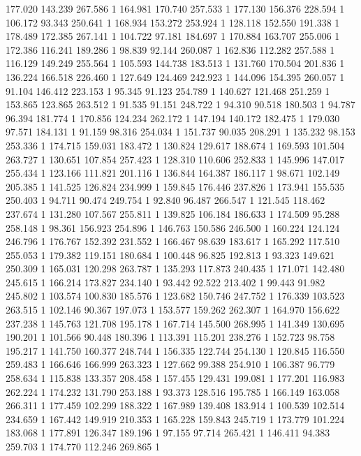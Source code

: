 	177.020	143.239	267.586	1
	164.981	170.740	257.533	1
	177.130	156.376	228.594	1
	106.172	93.343	250.641	1
	168.934	153.272	253.924	1
	128.118	152.550	191.338	1
	178.489	172.385	267.141	1
	104.722	97.181	184.697	1
	170.884	163.707	255.006	1
	172.386	116.241	189.286	1
	98.839	92.144	260.087	1
	162.836	112.282	257.588	1
	116.129	149.249	255.564	1
	105.593	144.738	183.513	1
	131.760	170.504	201.836	1
	136.224	166.518	226.460	1
	127.649	124.469	242.923	1
	144.096	154.395	260.057	1
	91.104	146.412	223.153	1
	95.345	91.123	254.789	1
	140.627	121.468	251.259	1
	153.865	123.865	263.512	1
	91.535	91.151	248.722	1
	94.310	90.518	180.503	1
	94.787	96.394	181.774	1
	170.856	124.234	262.172	1
	147.194	140.172	182.475	1
	179.030	97.571	184.131	1
	91.159	98.316	254.034	1
	151.737	90.035	208.291	1
	135.232	98.153	253.336	1
	174.715	159.031	183.472	1
	130.824	129.617	188.674	1
	169.593	101.504	263.727	1
	130.651	107.854	257.423	1
	128.310	110.606	252.833	1
	145.996	147.017	255.434	1
	123.166	111.821	201.116	1
	136.844	164.387	186.117	1
	98.671	102.149	205.385	1
	141.525	126.824	234.999	1
	159.845	176.446	237.826	1
	173.941	155.535	250.403	1
	94.711	90.474	249.754	1
	92.840	96.487	266.547	1
	121.545	118.462	237.674	1
	131.280	107.567	255.811	1
	139.825	106.184	186.633	1
	174.509	95.288	258.148	1
	98.361	156.923	254.896	1
	146.763	150.586	246.500	1
	160.224	124.124	246.796	1
	176.767	152.392	231.552	1
	166.467	98.639	183.617	1
	165.292	117.510	255.053	1
	179.382	119.151	180.684	1
	100.448	96.825	192.813	1
	93.323	149.621	250.309	1
	165.031	120.298	263.787	1
	135.293	117.873	240.435	1
	171.071	142.480	245.615	1
	166.214	173.827	234.140	1
	93.442	92.522	213.402	1
	99.443	91.982	245.802	1
	103.574	100.830	185.576	1
	123.682	150.746	247.752	1
	176.339	103.523	263.515	1
	102.146	90.367	197.073	1
	153.577	159.262	262.307	1
	164.970	156.622	237.238	1
	145.763	121.708	195.178	1
	167.714	145.500	268.995	1
	141.349	130.695	190.201	1
	101.566	90.448	180.396	1
	113.391	115.201	238.276	1
	152.723	98.758	195.217	1
	141.750	160.377	248.744	1
	156.335	122.744	254.130	1
	120.845	116.550	259.483	1
	166.646	166.999	263.323	1
	127.662	99.388	254.910	1
	106.387	96.779	258.634	1
	115.838	133.357	208.458	1
	157.455	129.431	199.081	1
	177.201	116.983	262.224	1
	174.232	131.790	253.188	1
	93.373	128.516	195.785	1
	166.149	163.058	266.311	1
	177.459	102.299	188.322	1
	167.989	139.408	183.914	1
	100.539	102.514	234.659	1
	167.442	149.919	210.353	1
	165.228	159.843	245.719	1
	173.779	101.224	183.068	1
	177.891	126.347	189.196	1
	97.155	97.714	265.421	1
	146.411	94.383	259.703	1
	174.770	112.246	269.865	1
